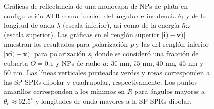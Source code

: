\begin{figure}[h!]\centering
{}\vspace*{-.5em}
	\caption{Gráficas de reflectancia de una monocapa de NPs de plata en configuración ATR como función del ángulo de incidencia $\theta_i$ y de la longitud de onda $\lambda$ (escala inferior), así como de la energía  $\hbar\omega$ (escala superior).  Las gráficas   en el renglón superior [$\mathbf{i)-v)}$] muestran los resultados para  polarización \emph{p} y las del renglón inferior  [$\mathbf{vi)-x)}$]  para polarización  \emph{s}, donde se consideró una fracción de cubierta $\Theta = 0.1$ y  NPs de radio  $a$: $30$ nm, $35$ nm, $40$ nm, $45$ nm y $50$ nm.  Las líneas verticales punteadas verdes y rosas corresponden a las SP-SPRs dipolar y  cuadrupolar, respectivamente.  Los puntos amarillos corresponden a los mínimos en $R$ para ángulos mayores a $\theta_c\approx 62.5^\circ$ y longitudes de onda mayores a la SP-SPRs dipolar.
}	\label{fig:Ag-R-Rad}	
	\end{figure}	

